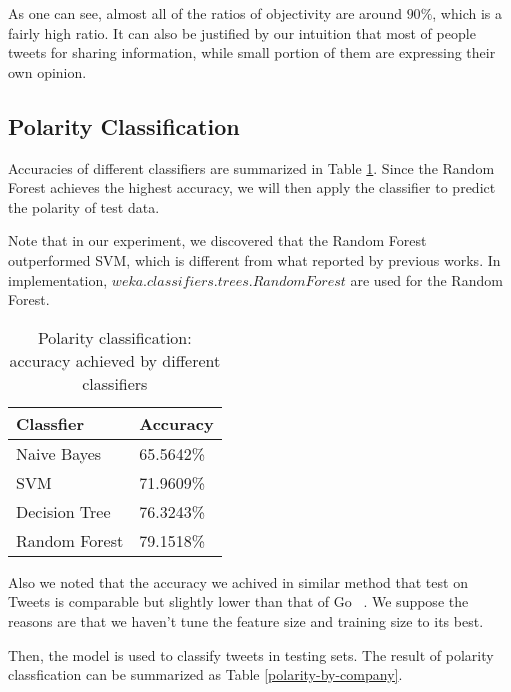 \documentclass[12pt]{article}
\begin{document}
As one can see, almost all of the ratios of objectivity are around $90\%$, which is a fairly high ratio. It can also be justified by our intuition that most of people tweets for sharing information, while small portion of them are expressing their own opinion.

\subsection{Polarity Classification}
Accuracies of different classifiers are summarized in Table \ref{classifiers-polarity}. Since the Random Forest achieves the highest accuracy, we will then apply the classifier to predict the polarity of test data.

Note that in our experiment, we discovered that the Random Forest outperformed SVM, which is different from what reported by previous works. In implementation, $weka.classifiers.trees.RandomForest$ are used for the Random Forest.

\begin{table}
\begin{center}
    \begin{tabular}{ | l || l | }
        \hline
        \textbf{Classfier} &  \textbf{Accuracy} \\ \hline
        \hline
        Naive Bayes &  65.5642\% \\ \hline
        SVM & 71.9609\% \\ \hline
        Decision Tree & 76.3243\% \\ \hline
        Random Forest & 79.1518\% \\ \hline
    \end{tabular}
\caption{Polarity classification: accuracy achieved by different classifiers}
\label{classifiers-polarity}
\end{center}
\end{table}

Also we noted that the accuracy we achived in similar method that test on Tweets is comparable but slightly lower than that of Go \etal~\cite{Go:09}. We suppose the reasons are that we haven't tune the feature size and training size to its best.

Then, the model is used to classify tweets in testing sets. The result of polarity classfication can be summarized as Table \ref{polarity-by-company}.
\end{document}
